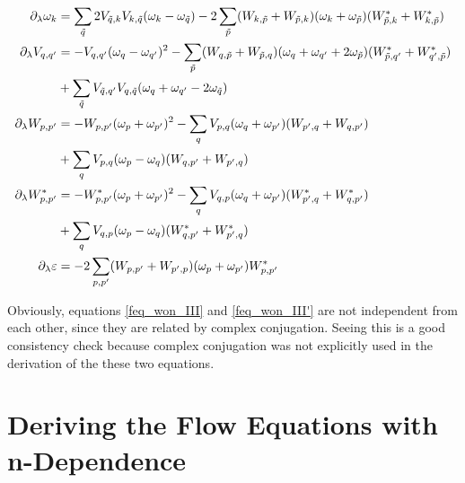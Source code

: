 \begin{appendix}
\begin{flushleft}
\begin{subequations}
\begin{align}
\partial_\lambda\omega_k&= \Sum_{\tilde q}2V_{\tilde q,k}V_{k,\tilde q}(\omega_k-\omega_{\tilde q})-2\Sum_{\tilde p}(W_{k,\tilde p}+W_{\tilde p,k})(\omega_k+\omega_{\tilde p})(W_{\tilde p, k}^*+W_{k,\tilde p}^*)\label{feq_won_I}\\ 
\partial_\lambda V_{q,q^\prime}&=-V_{q,q^\prime}(\omega_q-\omega_{q^\prime})^2-\Sum_{\tilde p}(W_{q,\tilde p}+W_{\tilde p,q})(\omega_q+\omega_{ q^\prime}+2\omega_{\tilde p})(W_{\tilde p, q^\prime}^*+W_{q^\prime,\tilde p}^*) \nonumber\\ \quad&
+ \Sum_{\tilde q}V_{\tilde q,q^\prime}V_{q,\tilde q}(\omega_q+\omega_{q^\prime}-2\omega_{\tilde q}) %
\label{feq_won_II} \\ 
\partial_\lambda W_{p,p^\prime}&=-W_{p,p^\prime}(\omega_p+\omega_{p^\prime})^2-\Sum_{ q}V_{ p, q}(\omega_q+\omega_{p^\prime})(W_{p^\prime,q}+W_{q,p^\prime}) \nonumber\\ \quad&
+ \Sum_{q}V_{{p},q}(\omega_{p}-\omega_{q}) (W_{ q, p^\prime}+W_{ p^\prime, q})\label{feq_won_III}\\ 
\partial_\lambda W_{p,p^\prime}^*&=-W_{p,p^\prime}^*(\omega_p+\omega_{p^\prime})^2-\Sum_{ q}V_{ q, p}(\omega_{q}+\omega_{p^\prime})(W_{p^\prime,q}^*+W_{q,p^\prime}^*)\nonumber\\ \quad& 
+\Sum_{q}V_{q,p}(\omega_{p}-\omega_{q}) (W_{ q, p^\prime}^*+W_{ p^\prime, {q}}^*)\label{feq_won_III'}\\ 
\partial_\lambda \varepsilon&=-2\Sum_{p,p^\prime}(W_{p,p^\prime}+W_{p^\prime,p})(\omega_p+\omega_{p^\prime})W_{p,p^\prime}^*\label{feq_won_IV}
\end{align}
\end{subequations}
\end{flushleft}
Obviously, equations \ref{feq_won_III} and \ref{feq_won_III'} are not independent from each other, since they are related by complex conjugation. Seeing this is a good consistency check because complex conjugation was not explicitly used in the derivation of the these two equations.\\
\section{Deriving the Flow Equations with n-Dependence}


\end{appendix}
